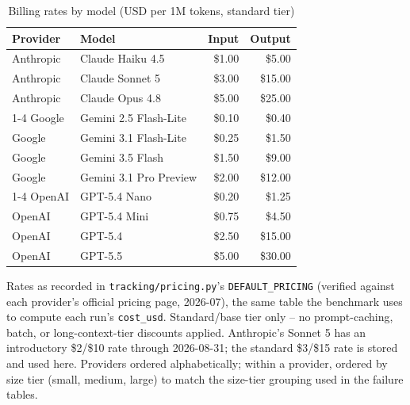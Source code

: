 %
%

\begin{table}[htbp]
  \centering
  \caption{Billing rates by model (USD per 1M tokens, standard tier)}
  \label{tab:cost-rates}
  \begin{tabular}{llrr}
    \toprule
    Provider & Model & Input & Output \\
    \midrule
    Anthropic & Claude Haiku 4.5   & \$1.00 & \$5.00  \\
    Anthropic & Claude Sonnet 5    & \$3.00 & \$15.00 \\
    Anthropic & Claude Opus 4.8    & \$5.00 & \$25.00 \\
    \cmidrule(lr){1-4}
    Google & Gemini 2.5 Flash-Lite & \$0.10 & \$0.40  \\
    Google & Gemini 3.1 Flash-Lite & \$0.25 & \$1.50  \\
    Google & Gemini 3.5 Flash      & \$1.50 & \$9.00  \\
    Google & Gemini 3.1 Pro Preview & \$2.00 & \$12.00 \\
    \cmidrule(lr){1-4}
    OpenAI & GPT-5.4 Nano  & \$0.20 & \$1.25  \\
    OpenAI & GPT-5.4 Mini  & \$0.75 & \$4.50  \\
    OpenAI & GPT-5.4       & \$2.50 & \$15.00 \\
    OpenAI & GPT-5.5       & \$5.00 & \$30.00 \\
    \bottomrule
  \end{tabular}
  \par\smallskip
  \footnotesize Rates as recorded in \texttt{tracking/pricing.py}'s \texttt{DEFAULT\_PRICING} (verified against each provider's official pricing page, 2026-07), the same table the benchmark uses to compute each run's \texttt{cost\_usd}. Standard/base tier only -- no prompt-caching, batch, or long-context-tier discounts applied. Anthropic's Sonnet 5 has an introductory \$2/\$10 rate through 2026-08-31; the standard \$3/\$15 rate is stored and used here. Providers ordered alphabetically; within a provider, ordered by size tier (small, medium, large) to match the size-tier grouping used in the failure tables.
\end{table}

